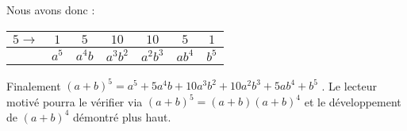 \medskip
Nous avons donc :

\medskip
\begin{center}
\begin{tabular}{|l*{6}{|c}|}
	\hline
	$5 \rightarrow$
		& $1$    &  $5$      &  $10$       &  $10$       &  $5$      &  $1$
	\\ \hline
		& $a^5$  &  $a^4 b$  &  $a^3 b^2$  &  $a^2 b^3$  &  $a b^4$  &  $b^5$
	\\ \hline
\end{tabular}
\end{center}

\medskip
Finalement $(a + b)^5 = a^5 + 5 a^4 b + 10 a^3 b^2 + 10 a^2 b^3 + 5 a b^4 + b^5$ . Le lecteur motivé pourra le vérifier via $(a + b)^5 = (a + b) (a + b)^4$ et le développement de $(a + b)^4$ démontré plus haut.

